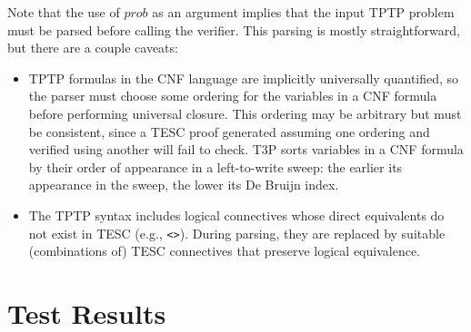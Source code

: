 \documentclass[12pt]{article}
\newcommand{\midtilde}{\raisebox{0.5ex}{\texttildelow}}
\newcommand{\Prf}[0]{\mathit{prf}}
\begin{document}


Note that the use of $\mathit{prob}$ as an argument implies that the input TPTP problem 
must be parsed before calling the verifier. This parsing is mostly straightforward, but 
there are a couple caveats: 
\begin{itemize}
  \item TPTP formulas in the CNF language are implicitly universally quantified, so the parser must 
    choose some ordering for the variables in a CNF formula before performing universal closure. 
    This ordering may be arbitrary but must be consistent, since a TESC proof generated assuming 
    one ordering and verified using another will fail to check. T3P sorts variables in a CNF formula by 
    their order of appearance in a left-to-write sweep: the earlier its appearance in the sweep, 
    the lower its De Bruijn index.
  \item The TPTP syntax includes logical connectives whose direct equivalents do not exist in TESC (e.g., \texttt{<\midtilde>}). During parsing, 
    they are replaced by suitable (combinations of) TESC connectives that preserve logical equivalence.
\end{itemize}


\section{Test Results} \label{sec:results}
\end{document}
